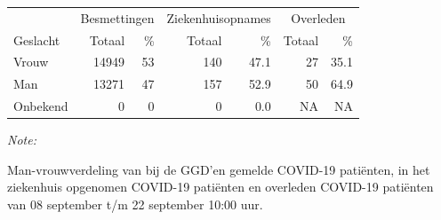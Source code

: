 \documentclass[
  english,
  man,floatsintext]{apa6}
\begin{document}
\begin{table}
\centering\begingroup\fontsize{11}{13}\selectfont

\begin{threeparttable}
\begin{tabular}{lrrrrrr}
\toprule
\multicolumn{1}{c}{ } & \multicolumn{2}{c}{Besmettingen} & \multicolumn{2}{c}{Ziekenhuisopnames} & \multicolumn{2}{c}{Overleden} \\
\cmidrule(l{3pt}r{3pt}){2-3} \cmidrule(l{3pt}r{3pt}){4-5} \cmidrule(l{3pt}r{3pt}){6-7}
Geslacht & Totaal & \% & Totaal & \% & Totaal & \%\\
\midrule
Vrouw & 14949 & 53 & 140 & 47.1 & 27 & 35.1\\
Man & 13271 & 47 & 157 & 52.9 & 50 & 64.9\\
Onbekend & 0 & 0 & 0 & 0.0 & NA & NA\\
\bottomrule
\end{tabular}
\begin{tablenotes}
\item \textit{Note: } 
\item Man-vrouwverdeling van bij de GGD’en gemelde COVID-19 patiënten, in het ziekenhuis opgenomen COVID-19 patiënten en overleden COVID-19 patiënten van 08 september t/m 22 september 10:00 uur.
\end{tablenotes}
\end{threeparttable}
\endgroup{}
\end{table}
\newpage
\end{document}
